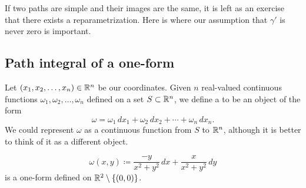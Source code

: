 If two paths are simple and their images are the same, it is
left as an exercise that there exists a reparametrization.
Here is where our assumption that $\gamma'$ is never zero is important.

\subsection{Path integral of a one-form}

\begin{defn}
Let $(x_1,x_2,\ldots,x_n) \in {\mathbb{R}}^n$ be our coordinates.
Given $n$ real-valued continuous functions
$\omega_1,\omega_2,\ldots,\omega_n$ defined on a set $S \subset {\mathbb{R}}^n$,
we define a \emph{}
to be an object of the form
\begin{equation*}
\omega = \omega_1 \,dx_1 + \omega_2 \,dx_2 + \cdots + \omega_n \,dx_n .
\end{equation*}
We could represent $\omega$ as a continuous function from $S$ to ${\mathbb{R}}^n$,
although it is better to think of it as a different object.
\end{defn}

\begin{example}
\begin{equation*}
\omega(x,y) \coloneqq \frac{-y}{x^2+y^2} \,dx + \frac{x}{x^2+y^2} \,dy
\end{equation*}
is a one-form defined on ${\mathbb{R}}^2 \setminus \{ (0,0) \}$.
\end{example}

